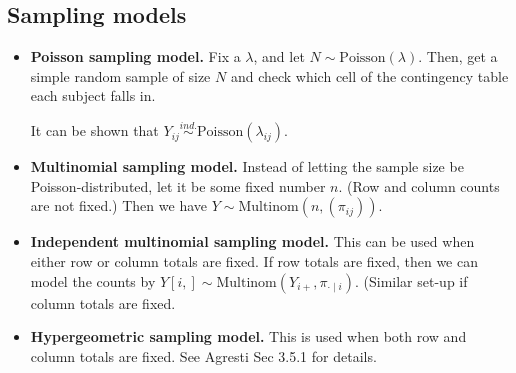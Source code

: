 \documentclass[twoside]{article}
\newcommand\lmb{\lambda}
\begin{document}
\subsection{Sampling models}
\begin{itemize}
\item \textbf{Poisson sampling model.} Fix a $\lmb$, and let $N \sim \text{Poisson}(\lmb)$. Then, get a simple random sample of size $N$ and check which cell of the contingency table each subject falls in.

It can be shown that $Y_{ij} \stackrel{ind.}{\sim} \text{Poisson}(\lmb_{ij})$.

\item \textbf{Multinomial sampling model.} Instead of letting the sample size be Poisson-distributed, let it be some fixed number $n$. (Row and column counts are not fixed.) Then we have $Y \sim \text{Multinom}\left(n, (\pi_{ij}) \right)$.

\item \textbf{Independent multinomial sampling model.} This can be used when either row or column totals are fixed. If row totals are fixed, then we can model the counts by $Y[i, ] \sim \text{Multinom}(Y_{i+}, \pi_{\cdot \mid i})$. (Similar set-up if column totals are fixed.

\item \textbf{Hypergeometric sampling model.} This is used when both row and column totals are fixed. See Agresti Sec 3.5.1 for details.
\end{itemize}
\end{document}
